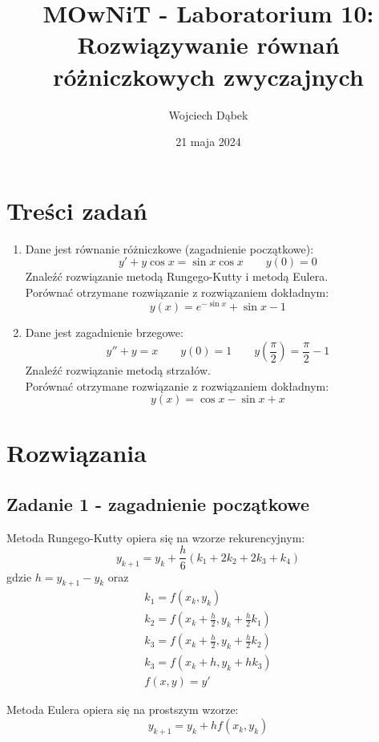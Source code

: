 \documentclass{article}
\title{MOwNiT - Laboratorium 10:\\
Rozwiązywanie równań różniczkowych zwyczajnych}
\author{Wojciech Dąbek}
\date{21 maja 2024}
\begin{document}
\maketitle

\section{Treści zadań}
\begin{enumerate}
    \item Dane jest równanie różniczkowe (zagadnienie początkowe):
    \[y' + y \cos x = \sin x \cos x \qquad y(0) = 0\]
    Znaleźć rozwiązanie metodą Rungego-Kutty i metodą Eulera.\\
    Porównać otrzymane rozwiązanie z rozwiązaniem dokładnym:
    \[y(x) = e^{-\sin x} + \sin x - 1\]
    \item Dane jest zagadnienie brzegowe:
    \[y'' + y = x \qquad y(0) = 1 \qquad y\left(\frac{\pi}{2}\right) = \frac{\pi}{2} - 1\]
    Znaleźć rozwiązanie metodą strzałów.\\
    Porównać otrzymane rozwiązanie z rozwiązaniem dokładnym:
    \[y(x) = \cos x - \sin x + x\]
\end{enumerate}

\newpage

\section{Rozwiązania}

\subsection{Zadanie 1 - zagadnienie początkowe}

Metoda Rungego-Kutty opiera się na wzorze rekurencyjnym:
\[y_{k+1} = y_k + \frac{h}{6}(k_1 + 2k_2 + 2k_3 + k_4)\]
gdzie \(h = y_{k+1} - y_k\) oraz
\begin{gather*}
    k_1 = f(x_k, y_k)\\
    k_2 = f(x_k + \frac{h}{2}, y_k + \frac{h}{2} k_1)\\
    k_3 = f(x_k + \frac{h}{2}, y_k + \frac{h}{2} k_2)\\
    k_3 = f(x_k + h, y_k + h k_3)\\
    f(x, y) = y'
\end{gather*}

\noindent
Metoda Eulera opiera się na prostszym wzorze:
\[y_{k+1} = y_k + h f(x_k, y_k)\]
\end{document}
